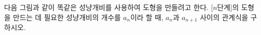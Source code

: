 다음 그림과 같이 똑같은 성냥개비를 사용하여 도형을 만들려고 한다. [$n$단계]의 도형을 만드는 데 필요한 성냥개비의 개수를 $a_n$이라 할 때, $a_n$과 $a_{n+1}$ 사이의 관계식을 구하시오.
\par\smallskip\begin{center}\resizebox{\ifdim\width>\linewidth\linewidth\else\width\fi}{!}{}\end{center}
